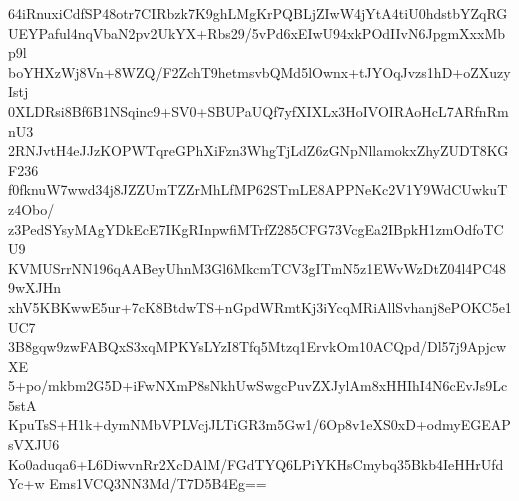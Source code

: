 64iRnuxiCdfSP48otr7CIRbzk7K9ghLMgKrPQBLjZIwW4jYtA4tiU0hdstbYZqRG
UEYPaful4nqVbaN2pv2UkYX+Rbs29/5vPd6xEIwU94xkPOdIIvN6JpgmXxxMbp9l
boYHXzWj8Vn+8WZQ/F2ZchT9hetmsvbQMd5lOwnx+tJYOqJvzs1hD+oZXuzyIstj
0XLDRsi8Bf6B1NSqinc9+SV0+SBUPaUQf7yfXIXLx3HoIVOIRAoHcL7ARfnRmnU3
2RNJvtH4eJJzKOPWTqreGPhXiFzn3WhgTjLdZ6zGNpNllamokxZhyZUDT8KGF236
f0fknuW7wwd34j8JZZUmTZZrMhLfMP62STmLE8APPNeKc2V1Y9WdCUwkuTz4Obo/
z3PedSYsyMAgYDkEcE7IKgRInpwfiMTrfZ285CFG73VcgEa2IBpkH1zmOdfoTCU9
KVMUSrrNN196qAABeyUhnM3Gl6MkcmTCV3gITmN5z1EWvWzDtZ04l4PC489wXJHn
xhV5KBKwwE5ur+7cK8BtdwTS+nGpdWRmtKj3iYcqMRiAllSvhanj8ePOKC5e1UC7
3B8gqw9zwFABQxS3xqMPKYsLYzI8Tfq5Mtzq1ErvkOm10ACQpd/Dl57j9ApjcwXE
5+po/mkbm2G5D+iFwNXmP8sNkhUwSwgcPuvZXJylAm8xHHIhI4N6cEvJs9Lc5stA
KpuTsS+H1k+dymNMbVPLVcjJLTiGR3m5Gw1/6Op8v1eXS0xD+odmyEGEAPsVXJU6
Ko0aduqa6+L6DiwvnRr2XcDAlM/FGdTYQ6LPiYKHsCmybq35Bkb4IeHHrUfdYc+w
Ems1VCQ3NN3Md/T7D5B4Eg==

